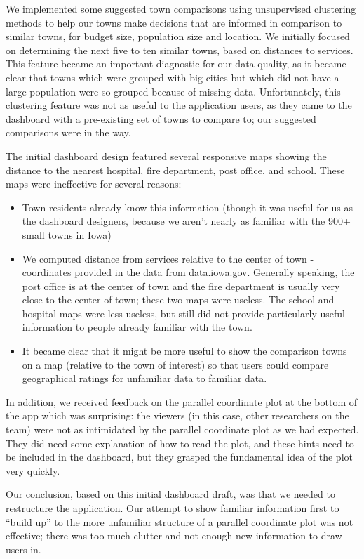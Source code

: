 \documentclass[print]{nuthesis}
\providecommand{\tightlist}{%
  \setlength{\itemsep}{0pt}\setlength{\parskip}{0pt}}
\begin{document}
We implemented some suggested town comparisons using unsupervised clustering methods to help our towns make decisions that are informed in comparison to similar towns, for budget size, population size and location. We initially focused on determining the next five to ten similar towns, based on distances to services. This feature became an important diagnostic for our data quality, as it became clear that towns which were grouped with big cities but which did not have a large population were so grouped because of missing data. Unfortunately, this clustering feature was not as useful to the application users, as they came to the dashboard with a pre-existing set of towns to compare to; our suggested comparisons were in the way.

The initial dashboard design featured several responsive maps showing the distance to the nearest hospital, fire department, post office, and school. These maps were ineffective for several reasons:

\begin{itemize}
\tightlist
\item
  Town residents already know this information (though it was useful for us as the dashboard designers, because we aren't nearly as familiar with the 900+ small towns in Iowa)
\item
  We computed distance from services relative to the center of town - coordinates provided in the data from \url{data.iowa.gov}. Generally speaking, the post office is at the center of town and the fire department is usually very close to the center of town; these two maps were useless. The school and hospital maps were less useless, but still did not provide particularly useful information to people already familiar with the town.
\item
  It became clear that it might be more useful to show the comparison towns on a map (relative to the town of interest) so that users could compare geographical ratings for unfamiliar data to familiar data.
\end{itemize}

In addition, we received feedback on the parallel coordinate plot at the bottom of the app which was surprising: the viewers (in this case, other researchers on the team) were not as intimidated by the parallel coordinate plot as we had expected. They did need some explanation of how to read the plot, and these hints need to be included in the dashboard, but they grasped the fundamental idea of the plot very quickly.

Our conclusion, based on this initial dashboard draft, was that we needed to restructure the application. Our attempt to show familiar information first to ``build up'' to the more unfamiliar structure of a parallel coordinate plot was not effective; there was too much clutter and not enough new information to draw users in.
\end{document}
